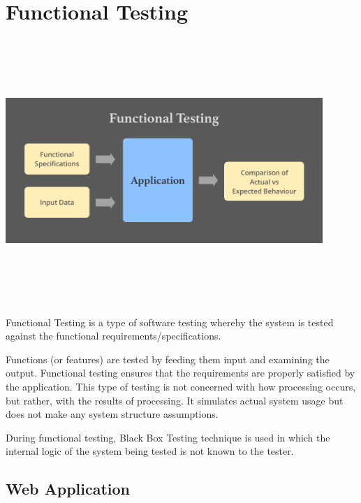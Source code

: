 \section{Functional Testing}
\begin{center}
    \includegraphics[width=12cm,height=10cm,keepaspectratio]{images/Functional-Testing-feature-image}
\end{center}
Functional Testing is a type of software testing whereby the system is tested 
against the functional requirements/specifications.
\par
\bigskip
Functions (or features) are tested by feeding them input and examining the 
output. Functional testing ensures that the requirements are properly satisfied 
by the application. This type of testing is not concerned with how processing 
occurs, but rather, with the results of processing. It simulates actual system 
usage but does not make any system structure assumptions.
\par
\bigskip
During functional testing, Black Box Testing technique is used in which the 
internal logic of the system being tested is not known to the tester.

\subsection{Web Application}


